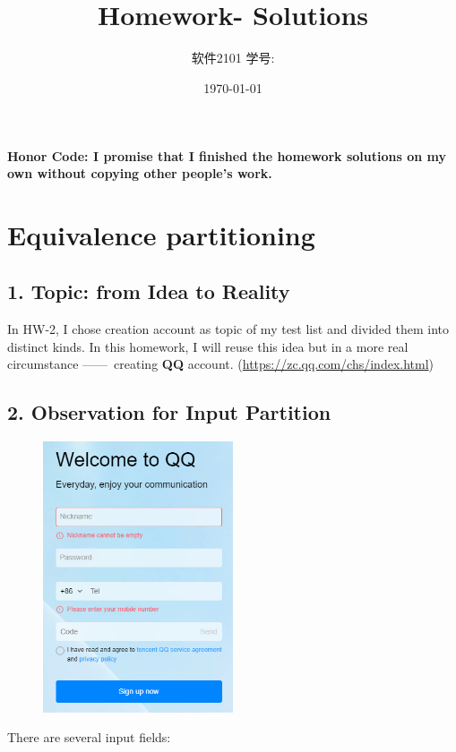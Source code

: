 \documentclass[11pt, oneside]{article}  %
\title{\vspace{-4cm}\CourseCodeName \space
        \Session \protect\\  Homework-\textbf{\Homework} Solutions}
\author{软件2101 \Name \space 学号: \SID}
\date{\today}
\begin{document}
\maketitle

\textbf{Honor Code: I promise that I finished the homework solutions on my own without copying other people's work.}

\section*{Equivalence partitioning}

\subsection*{1. Topic: from Idea to Reality}

In HW-2, I chose creation account as topic of my test list and divided them into distinct kinds. 
In this homework, I will reuse this idea but in a more real circumstance ——~creating \textbf{QQ} account. 
(\url{https://zc.qq.com/chs/index.html})

\subsection*{2. Observation for Input Partition}

\begin{figure}[H]
    \centering
    \includegraphics[width = 0.5\textwidth]{pic/3.0.png}
\end{figure}

There are several input fields: 
\end{document}
